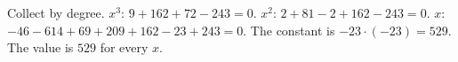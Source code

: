 Collect by degree. $x^3$: $9+162+72-243=0$. $x^2$: $2+81-2+162-243=0$. $x$: $-46-614+69+209+162-23+243=0$. The constant is $-23\cdot(-23)=529$. The value is $\boxed{529}$ for every $x$.
